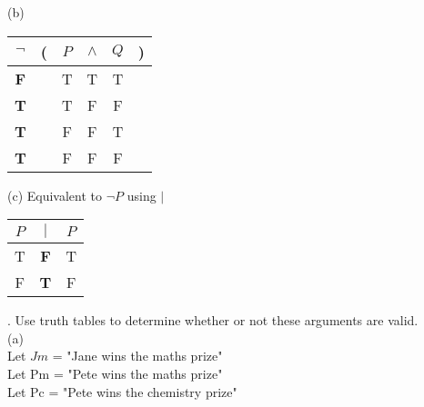 \documentclass{article}
\begin{document}
\vspace{2em}
\linebreak
(b)\begin{tabular}{cccccc}
$\neg$&(&$P$&$\wedge$&$Q$&)\\
\hline
\textbf{F}&&T&T&T&\\
\textbf{T}&&T&F&F&\\
\textbf{T}&&F&F&T&\\
\textbf{T}&&F&F&F&\\
\end{tabular}
\vspace{2em}
\linebreak
(c) Equivalent to $\neg P$ using $|$\\
\begin{tabular}{ccc}
$P$&$|$&$P$\\
\hline
T&\textbf{F}&T\\
F&\textbf{T}&F\\
\end{tabular}
\vspace{2em}
. Use truth tables to determine whether or not these arguments are valid.\\
(a)\\
Let $Jm$ = "Jane wins the maths prize"\\
Let Pm = "Pete wins the maths prize"\\
Let Pc = "Pete wins the chemistry prize"\\
\end{document}
